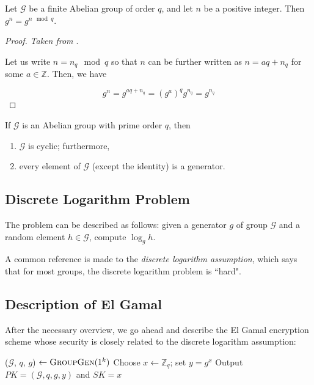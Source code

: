 \begin{corollary}
Let $ \mathcal{G} $ be a finite Abelian group of order $ q $, and let $ n $ be a positive integer.
Then $ g^n = g^{n \mod q} $.
\end{corollary}

\begin{proof}
\textit{Taken from \cite{koocmsc}}.

Let us write $ n = n_q \mod q $ so that $ n $ can be further written as $ n = aq + n_q $ for some $ a \in \mathbb{Z} $. Then, we have

\begin{equation*}
g^n = g^{aq+n_q} = (g^a)^q g^{n_q} = g^{n_q}
\end{equation*}
\end{proof}

\begin{lemma}
If $ \mathcal{G} $ is an Abelian group with prime order $ q $, then 
\begin{enumerate}
    \item $ \mathcal{G} $ is cyclic; furthermore,
    \item every element of $ \mathcal{G} $ (except the identity) is a generator.
\end{enumerate}
\end{lemma}

\subsection{Discrete Logarithm Problem}

The problem can be described as follows: given a generator $ g $ of group $ \mathcal{G} $ and a random element $ h \in \mathcal{G} $, compute $ \log_g h $.

A common reference is made to the \textit{discrete logarithm assumption}, which says that for most groups, the discrete logarithm problem is ``hard".

\subsection{Description of El Gamal}

After the necessary overview, we go ahead and describe the El Gamal encryption scheme whose security is closely related to the discrete logarithm assumption:

\begin{algorithmic}
\STATE ($ \mathcal{G} $, $ q $, $ g $) $ \leftarrow \textsc{GroupGen} (1^k) $ 
\STATE Choose $ x \leftarrow \mathbb{Z}_q $; set $ y = g^x $ 
\STATE Output $ PK = ( \mathcal{G}, q, g, y) $ and $ SK = x $ 
\end{algorithmic}

